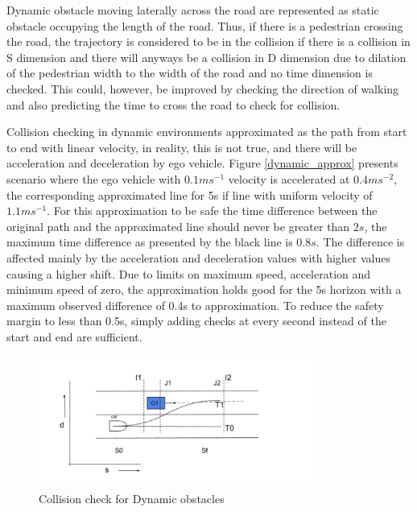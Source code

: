 Dynamic obstacle moving laterally across the road are represented as static obstacle occupying the length of the road. Thus, if there is a pedestrian crossing the road, the trajectory is considered to be in the collision if there is a collision in S dimension and there will anyways be a collision in D dimension due to dilation of the pedestrian width to the width of the road and no time dimension is checked. This could, however, be improved by checking the direction of walking and also predicting the time to cross the road to check for collision. 

Collision checking in dynamic environments approximated as the path from start to end with linear velocity, in reality, this is not true, and there will be acceleration and deceleration by ego vehicle. Figure \ref{dynamic_approx} presents scenario where the ego vehicle with $0.1ms^{-1}$ velocity is accelerated at $0.4ms^{-2}$, the corresponding approximated line for 5s if line with uniform velocity of $1.1ms^{-1}$. For this approximation to be safe the time difference between the original path and the approximated line should never be greater than $2s$, the maximum time difference as presented by the black line is $0.8s$. The difference is affected mainly by the acceleration and deceleration values with higher values causing a higher shift. Due to limits on maximum speed, acceleration and minimum speed of zero, the approximation holds good for the 5s horizon with a maximum observed difference of 0.4s to approximation. To reduce the safety margin to less than 0.5s, simply adding checks at every second instead of the start and end are sufficient. 



 \begin{figure}
    \centering
    \includegraphics[width=0.8\textwidth]{Images/dynamic_check.png}
    \caption{Collision check for Dynamic obstacles}
    \label{dynamic_check}
\end{figure}

